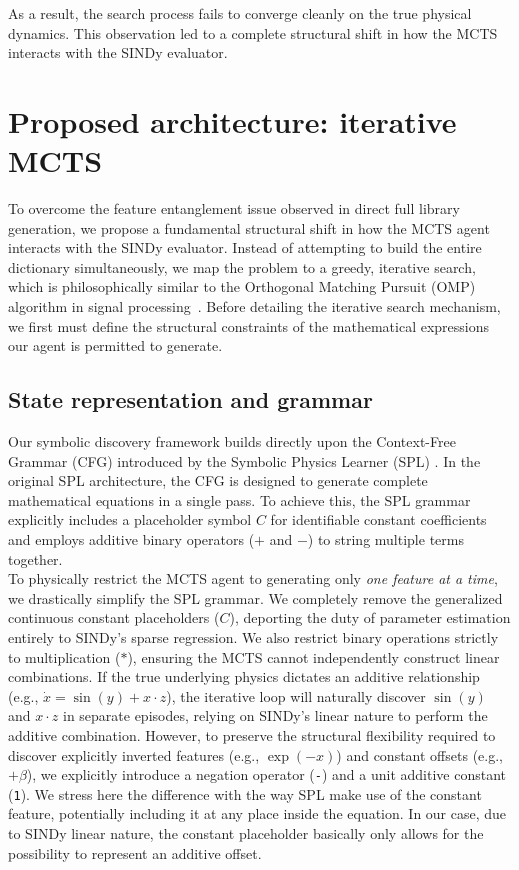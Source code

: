 \documentclass[11pt, a4paper]{article}
\begin{document}
As a result, the search process fails to converge cleanly on the true physical dynamics. This observation led to a complete structural shift in how the MCTS interacts with the SINDy evaluator.



\section{Proposed architecture: iterative MCTS}
\label{sec:proposed_architecture}



To overcome the feature entanglement issue observed in direct full library generation, we propose a fundamental structural shift in how the MCTS agent interacts with the SINDy evaluator. Instead of attempting to build the entire dictionary simultaneously, we map the problem to a greedy, iterative search, which is philosophically similar to the Orthogonal Matching Pursuit (OMP) algorithm in signal processing~\cite{mallat1993matching}. Before detailing the iterative search mechanism, we first must define the structural constraints of the mathematical expressions our agent is permitted to generate.

\newpage
\subsection{State representation and grammar}

Our symbolic discovery framework builds directly upon the Context-Free Grammar (CFG) introduced by the Symbolic Physics Learner (SPL) \cite{sun2023spl}. In the original SPL architecture, the CFG is designed to generate complete mathematical equations in a single pass. To achieve this, the SPL grammar explicitly includes a placeholder symbol $C$ for identifiable constant coefficients and employs additive binary operators ($+$ and $-$) to string multiple terms together. \\

To physically restrict the MCTS agent to generating only \textit{one feature at a time}, we drastically simplify the SPL grammar. We completely remove the generalized continuous constant placeholders ($C$), deporting the duty of parameter estimation entirely to SINDy's sparse regression. We also restrict binary operations strictly to multiplication ($*$), ensuring the MCTS cannot independently construct linear combinations. If the true underlying physics dictates an additive relationship (e.g., $\dot{x} = \sin(y) + x \cdot z$), the iterative loop will naturally discover $\sin(y)$ and $x \cdot z$ in separate episodes, relying on SINDy's linear nature to perform the additive combination. However, to preserve the structural flexibility required to discover explicitly inverted features (e.g., $\exp(-x)$) and constant offsets (e.g., $+ \beta$), we explicitly introduce a negation operator (\texttt{-}) and a unit additive constant  (\texttt{1}). We stress here the difference with the way SPL make use of the constant feature, potentially including it at any place inside the equation. In our case, due to SINDy linear nature, the constant placeholder basically only allows for the possibility to represent an additive offset.\\
\end{document}
